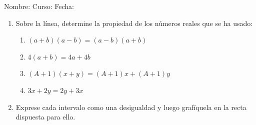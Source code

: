 \documentclass[letterpaper,fleqn]{article}
\newcommand{\LineaNombre}{%
\par
\vspace{\baselineskip}
Nombre:\hrulefill \; Curso: \underline{\hspace*{48pt}} \; Fecha: \underline{\hspace*{2.5cm}} \relax
\par}
\begin{document}
\LineaNombre
\begin{enumerate}
   \item Sobre la línea, determine la propiedad de los números reales que se ha usado:
  \begin{enumerate}
    \item $ (a+b)(a-b)=(a-b)(a+b) $ \underline{\hspace{6cm}}
    \item $ 4(a+b)=4a+4b $ \underline{\hspace{6cm}}
    \item $ (A+1)(x+y)=(A+1)x+(A+1)y $ \underline{\hspace{6cm}}
    \item $ 3x+2y=2y+3x $ \underline{\hspace{6cm}}
  \end{enumerate}
  \item Exprese cada intervalo como una desigualdad y luego grafíquela en la recta dispuesta para ello.
  

\end{enumerate}
\end{document}
